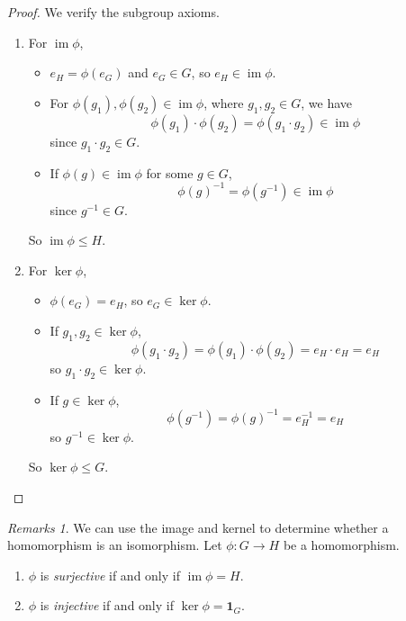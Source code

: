 \documentclass{article}
\theoremstyle{definition}
\theoremstyle{remark}
\newcommand{\pqty}[1]{\left(#1\right)}
\newcommand{\functiondomain}[3]{#1:#2\to #3}
\newcommand{\inverse}{^{-1}}
\newcommand{\subgroup}{\leq}
\newcommand{\img}{\operatorname{im}}
\newtheorem{remarks}[theorem]{Remarks}
\newcommand{\trivialgp}{\mathbf{1}}
\begin{document}
\begin{proof}
    We verify the subgroup axioms.

    \begin{enumerate}
        \item For \(\img \phi\),
        \begin{itemize}
            \item \(e_H = \phi\pqty{e_G}\) and \(e_G \in G\), so \(e_H \in \img \phi\).
            \item For \(\phi\pqty{g_1}, \phi\pqty{g_2} \in \img \phi\), where \(g_1, g_2 \in G\), we have
            \[
                \phi\pqty{g_1} \cdot \phi\pqty{g_2} = \phi\pqty{g_1 \cdot g_2} \in \img \phi
            \]
            since \(g_1 \cdot g_2 \in G\).
            \item If \(\phi \pqty{g} \in \img \phi\) for some \(g \in G\),
            \[
                \phi\pqty{g}\inverse = \phi\pqty{g\inverse} \in \img \phi
            \]
            since \(g\inverse \in G\).
        \end{itemize}

        So \(\img \phi \subgroup H\).
        
        \item For \(\ker \phi\),
        \begin{itemize}
            \item \(\phi\pqty{e_G} = e_H\), so \(e_G \in \ker \phi\).
            \item If \(g_1, g_2 \in \ker \phi\),
            \[
                \phi\pqty{g_1 \cdot g_2} = \phi\pqty{g_1} \cdot \phi\pqty{g_2} = e_H \cdot e_H = e_H
            \]
            so \(g_1 \cdot g_2 \in \ker \phi\).
            \item If \(g \in \ker \phi\),
            \[
                \phi\pqty{g\inverse} = \phi\pqty{g}\inverse = e_H\inverse = e_H
            \]
            so \(g \inverse \in \ker \phi\).
        \end{itemize}

        So \(\ker \phi \subgroup G\).
    \end{enumerate}
\end{proof}

\begin{remarks}
    We can use the image and kernel to determine whether a homomorphism is an isomorphism. Let \(\functiondomain{\phi}{G}{H}\) be a homomorphism.
    \begin{enumerate}
        \item \(\phi\) is \emph{surjective} if and only if \(\img \phi = H\).
        \item \(\phi\) is \emph{injective} if and only if \(\ker \phi = \trivialgp_{G}\).
    \end{enumerate}
\end{remarks}
\end{document}
